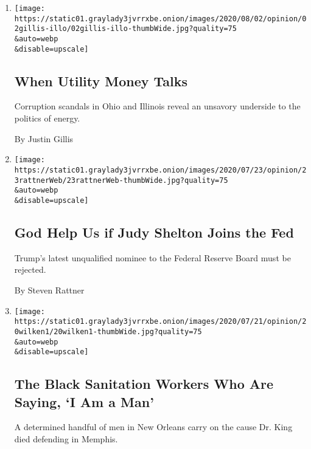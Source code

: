 \begin{enumerate}
\def\labelenumi{\arabic{enumi}.}
\item
  \href{/2020/08/02/opinion/utility-corruption-energy.html}{}

  \texttt{[image: https://static01.graylady3jvrrxbe.onion/images/2020/08/02/opinion/02gillis-illo/02gillis-illo-thumbWide.jpg?quality=75\\\&auto=webp\\\&disable=upscale]}

  \hypertarget{when-utility-money-talks}{%
  \subsection{When Utility Money Talks}\label{when-utility-money-talks}}

  Corruption scandals in Ohio and Illinois reveal an unsavory underside
  to the politics of energy.

  By Justin Gillis
\item
  \href{/2020/07/22/opinion/federal-reserve-judy-shelton.html}{}

  \texttt{[image: https://static01.graylady3jvrrxbe.onion/images/2020/07/23/opinion/23rattnerWeb/23rattnerWeb-thumbWide.jpg?quality=75\\\&auto=webp\\\&disable=upscale]}

  \hypertarget{god-help-us-if-judy-shelton-joins-the-fed}{%
  \subsection{God Help Us if Judy Shelton Joins the
  Fed}\label{god-help-us-if-judy-shelton-joins-the-fed}}

  Trump's latest unqualified nominee to the Federal Reserve Board must
  be rejected.

  By Steven Rattner
\item
  \href{/2020/07/20/opinion/new-orleans-garbage-strike.html}{}

  \texttt{[image: https://static01.graylady3jvrrxbe.onion/images/2020/07/21/opinion/20wilken1/20wilken1-thumbWide.jpg?quality=75\\\&auto=webp\\\&disable=upscale]}

  \hypertarget{the-black-sanitation-workers-who-are-saying-i-am-a-man}{%
  \subsection{The Black Sanitation Workers Who Are Saying, `I Am a
  Man'}\label{the-black-sanitation-workers-who-are-saying-i-am-a-man}}

  A determined handful of men in New Orleans carry on the cause Dr. King
  died defending in Memphis.


\end{enumerate}
